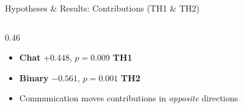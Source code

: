 \documentclass[aspectratio=169,10pt]{beamer}
\newcommand{\bo}[1]{\textcolor{binaryorange}{\textbf{#1}}}
\newcommand{\cb}[1]{\textcolor{chatblue}{\textbf{#1}}}
\newcommand{\yes}{\textcolor{controlgreen}{\checkmark}}
\begin{document}
\begin{frame}{Hypotheses \& Results: Contributions (TH1 \& TH2)}
\begin{columns}[T]
\begin{column}{0.46\textwidth}
    \vspace{0.4em}
    \begin{itemize}\small
      \item \cb{Chat} $+0.448$, $p{=}0.009$ \quad \textbf{TH1 \yes}
      \item \bo{Binary} $-0.561$, $p{=}0.001$ \quad \textbf{TH2 \yes}
      \item Communication moves contributions in \emph{opposite} directions
    \end{itemize}
  \end{column}
\end{columns}

\end{frame}

\end{document}
